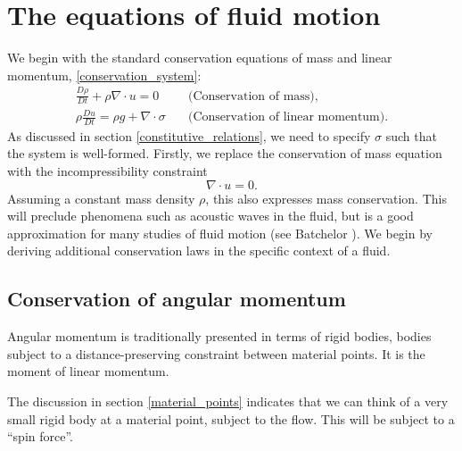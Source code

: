 \section{The equations of fluid motion}
We begin with the standard conservation equations of mass and linear momentum, \eqref{conservation_system}:
\begin{equation*}
\begin{split}
    \frac{D\rho}{Dt} + \rho\nabla\cdot u = 0 &\quad\text{(Conservation of mass)},
    \\
    \rho\frac{Du}{Dt} = \rho g + \nabla\cdot\sigma &\quad\text{(Conservation of linear momentum)}.
\end{split}
\end{equation*}
As discussed in section \ref{constitutive_relations}, we need to specify $\sigma$ such that the system is well-formed. Firstly, we replace the
conservation of mass equation with the incompressibility constraint
\begin{equation*}
    \nabla \cdot u = 0.
\end{equation*}
Assuming a constant mass density $\rho$, this also expresses mass conservation. This will preclude phenomena such as acoustic waves in the fluid,
but is a good approximation for many studies of fluid motion (see Batchelor \cite{batchelor}). We begin by deriving additional conservation laws
in the specific context of a fluid.

\subsection{Conservation of angular momentum}
Angular momentum is traditionally presented in terms of rigid bodies, bodies subject to a distance-preserving constraint between
material points. It is the moment of linear momentum.

The discussion in section \ref{material_points} indicates that we can think of a very small rigid body at a material point, subject to the flow.
This will be subject to a ``spin force''.

